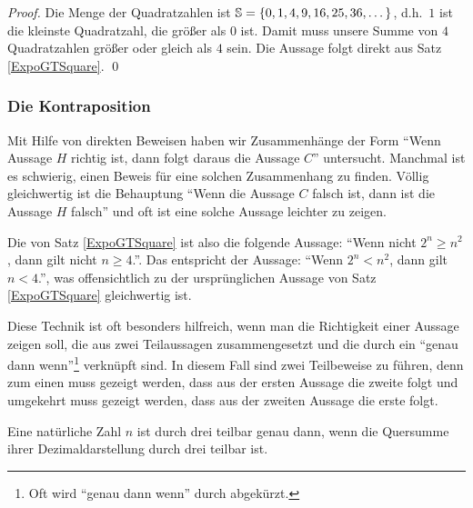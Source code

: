 \begin{proof}
Die Menge der Quadratzahlen ist $\mathbb{S} = \{0, 1, 4, 9, 16, 25, 36,
  \dots\}$, d.h.~$1$ ist die kleinste Quadratzahl, die größer als $0$
ist. Damit muss unsere Summe von $4$ Quadratzahlen größer oder gleich als $4$
sein. Die Aussage folgt direkt aus Satz \ref{ExpoGTSquare}.
\qed
\end{proof}

\subsubsection{Die Kontraposition}
\label{KontraPos}
Mit Hilfe von direkten Beweisen haben wir Zusammenhänge der Form
"`Wenn Aussage $H$ richtig ist, dann folgt daraus die Aussage $C$"'
untersucht. Manchmal ist es schwierig, einen Beweis für eine solchen
Zusammenhang zu finden. Völlig gleichwertig ist die Behauptung "`Wenn
die Aussage $C$ falsch ist, dann ist die Aussage $H$ falsch"' und oft
ist eine solche Aussage leichter zu zeigen.

Die  von 
Satz \ref{ExpoGTSquare} ist also die folgende Aussage: "`Wenn nicht 
$2^n \ge n^2$, dann gilt nicht $n \ge 4$."'. Das entspricht der 
Aussage: "`Wenn $2^n < n^2$, dann gilt $n < 4$."', was offensichtlich 
zu der ursprünglichen Aussage von Satz \ref{ExpoGTSquare} gleichwertig ist.

Diese Technik ist oft besonders hilfreich, wenn man die Richtigkeit
einer Aussage zeigen soll, die aus zwei Teilaussagen zusammengesetzt
und die durch ein "`genau dann wenn"'\footnote{Oft wird "`genau dann
wenn"' durch \emph{\gdw} abgekürzt.} verknüpft sind. In diesem Fall
sind zwei Teilbeweise zu führen, denn zum einen muss gezeigt werden,
dass aus der ersten Aussage die zweite folgt und umgekehrt muss
gezeigt werden, dass aus der zweiten Aussage die erste folgt.

\begin{theorem}
Eine natürliche Zahl $n$ ist durch drei teilbar genau dann, wenn die
Quersumme ihrer Dezimaldarstellung durch drei teilbar ist.
\end{theorem}

